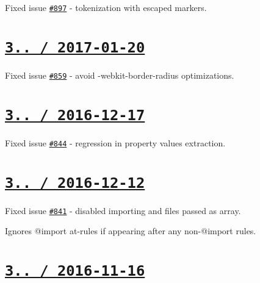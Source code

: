 \begin{DoxyItemize}
\item Fixed issue \href{https://github.com/jakubpawlowicz/clean-css/issues/897}{\tt \#897} -\/ tokenization with escaped markers.
\end{DoxyItemize}

\section*{\href{https://github.com/jakubpawlowicz/clean-css/compare/v3.4.23...v3.4.24}{\tt 3.. / 2017-\/01-\/20} }


\begin{DoxyItemize}
\item Fixed issue \href{https://github.com/jakubpawlowicz/clean-css/issues/859}{\tt \#859} -\/ avoid {\ttfamily -\/webkit-\/border-\/radius} optimizations.
\end{DoxyItemize}

\section*{\href{https://github.com/jakubpawlowicz/clean-css/compare/v3.4.22...v3.4.23}{\tt 3.. / 2016-\/12-\/17} }


\begin{DoxyItemize}
\item Fixed issue \href{https://github.com/jakubpawlowicz/clean-css/issues/844}{\tt \#844} -\/ regression in property values extraction.
\end{DoxyItemize}

\section*{\href{https://github.com/jakubpawlowicz/clean-css/compare/v3.4.21...v3.4.22}{\tt 3.. / 2016-\/12-\/12} }


\begin{DoxyItemize}
\item Fixed issue \href{https://github.com/jakubpawlowicz/clean-css/issues/841}{\tt \#841} -\/ disabled importing and files passed as array.
\item Ignores {\ttfamily @import} at-\/rules if appearing after any non-\/{\ttfamily @import} rules.
\end{DoxyItemize}

\section*{\href{https://github.com/jakubpawlowicz/clean-css/compare/v3.4.20...v3.4.21}{\tt 3.. / 2016-\/11-\/16} }



